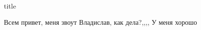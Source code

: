\documentclass[12pt,a4paper]{article}
\begin{document}
{title} %


Всем привет, меня звоут Владислав, как дела?,,,, У меня хорошо
\end{document}
